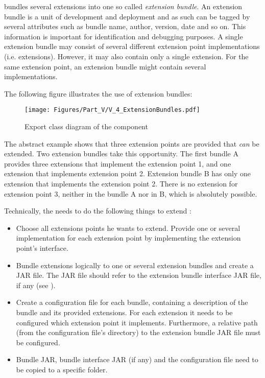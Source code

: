 \COMPextensionManagement{} bundles several extensions into one so called \emph{extension bundle}. An extension bundle is a unit of development and deployment and as such can be tagged by several attributes such as bundle name, author, version, date and so on. This information is important for identification and debugging purposes. A single extension bundle may consist of several different extension point implementations (i.e. extensions). However, it may also contain only a single extension. For the same extension point, an extension bundle might contain several implementations.

The following figure illustrates the use of extension bundles:

\begin{figure}[H]
	\centering
	\texttt{[image: Figures/Part\_V/V\_4\_ExtensionBundles.pdf]}
	\caption{Export class diagram of the component \COMPextensionManagement{}}
	\label{fig:V_4_ExtensionBundles}
\end{figure}

The abstract example shows that three extension points are provided that \emph{can} be extended. Two extension bundles take this opportunity. The first bundle A provides three extensions that implement the extension point 1, and one extension that implements extension point 2. Extension bundle B has only one extension that implements the extension point 2. There is no extension for extension point 3, neither in the bundle A nor in B, which is absolutely possible.

Technically, the \ACTORextender{} needs to do the following things to extend \LibName{}:
\begin{itemize}
	\item Choose all extensions points he wants to extend. Provide one or several implementation for each extension point by implementing the extension point's interface.
	\item Bundle extensions logically to one or several extension bundles and create a JAR file. The JAR file should refer to the extension bundle interface JAR file, if any (see ).
	\item Create a configuration file for each bundle, containing a description of the bundle and its provided extensions. For each extension it needs to be configured which extension point it implements. Furthermore, a relative path (from the configuration file's directory) to the extension bundle JAR file must be configured.
	\item Bundle JAR, bundle interface JAR (if any) and the configuration file need to be copied to a specific \LibName{} folder.
\end{itemize}

